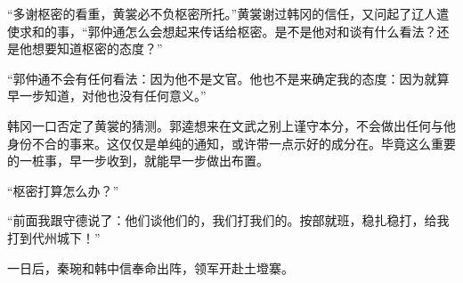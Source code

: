 “多谢枢密的看重，黄裳必不负枢密所托。”黄裳谢过韩冈的信任，又问起了辽人遣使求和的事，“郭仲通怎么会想起来传话给枢密。是不是他对和谈有什么看法？还是他想要知道枢密的态度？”

“郭仲通不会有任何看法：因为他不是文官。他也不是来确定我的态度：因为就算早一步知道，对他也没有任何意义。”

韩冈一口否定了黄裳的猜测。郭逵想来在文武之别上谨守本分，不会做出任何与他身份不合的事来。这仅仅是单纯的通知，或许带一点示好的成分在。毕竟这么重要的一桩事，早一步收到，就能早一步做出布置。

“枢密打算怎么办？”

“前面我跟守德说了：他们谈他们的，我们打我们的。按部就班，稳扎稳打，给我打到代州城下！”

一日后，秦琬和韩中信奉命出阵，领军开赴土墱寨。
